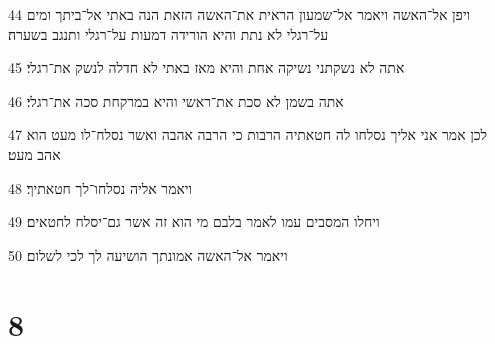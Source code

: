 \par 44 ויפן אל־האשה ויאמר אל־שמעון הראית את־האשה הזאת הנה באתי אל־ביתך ומים על־רגלי לא נתת והיא הורידה דמעות על־רגלי ותנגב בשערה׃
\par 45 אתה לא נשקתני נשיקה אחת והיא מאז באתי לא חדלה לנשק את־רגלי׃
\par 46 אתה בשמן לא סכת את־ראשי והיא במרקחת סכה את־רגלי׃
\par 47 לכן אמר אני אליך נסלחו לה חטאתיה הרבות כי הרבה אהבה ואשר נסלח־לו מעט הוא אהב מעט׃
\par 48 ויאמר אליה נסלחו־לך חטאתיך׃
\par 49 ויחלו המסבים עמו לאמר בלבם מי הוא זה אשר גם־יסלח לחטאים׃
\par 50 ויאמר אל־האשה אמונתך הושיעה לך לכי לשלום׃

\chapter{8}

